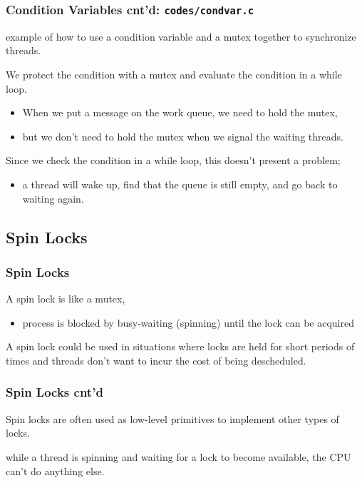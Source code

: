 \documentclass[newPxFont,sthlmFooter,nooffset]{beamer}
\begin{document}
\begin{frame}
  \frametitle{Condition Variables cnt'd: \texttt{codes/condvar.c}}
example of how to use a condition variable and a mutex together to synchronize threads.


We protect the condition with a mutex and evaluate the condition in a while loop.
\begin{itemize}
\item When we put a message on the work queue, we need to hold the
  mutex,
\item but we don’t need to hold the mutex when we signal the
  waiting threads.
\end{itemize}

Since we check the condition in a while loop, this doesn’t present a problem;
\begin{itemize}
\item a thread will wake up, find that the queue is still empty, and
  go back to waiting again.
\end{itemize}

\end{frame}

\subsection{Spin Locks}

\begin{frame}[t]
  \frametitle{Spin Locks}
A spin lock is like a mutex,
\begin{itemize}
\item process is blocked by busy-waiting (spinning) until the lock can be acquired
\end{itemize}
A spin lock could be used in situations where locks are held for short periods of times and threads don’t want to incur the cost of being descheduled.

\end{frame}

\begin{frame}[t]
  \frametitle{Spin Locks cnt'd}
Spin locks are often used as low-level primitives to implement other types of locks.

while a thread is spinning and waiting for a lock to become available, the CPU can’t do anything else.
\end{frame}
\end{document}
